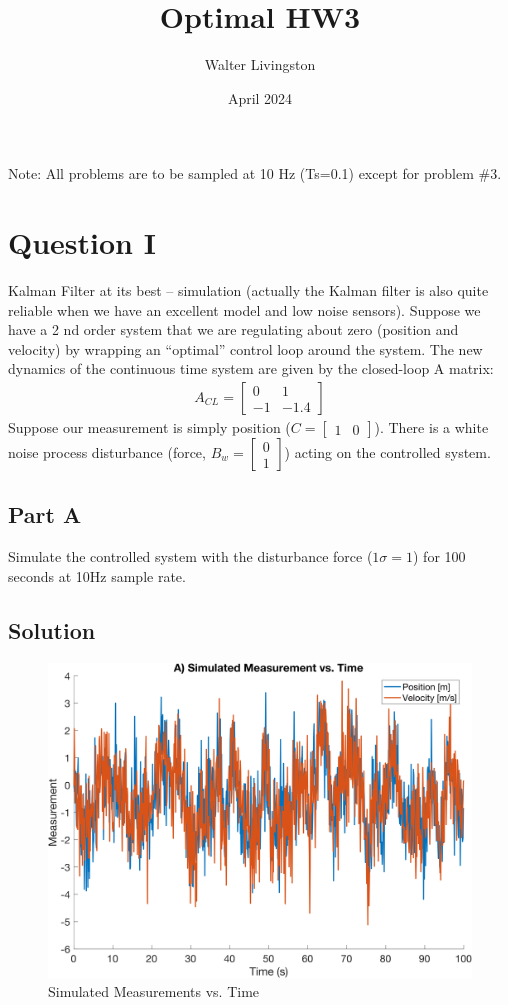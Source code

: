 \documentclass{article}
\title{Optimal HW3}
\author{Walter Livingston}
\date{April 2024}
\begin{document}
\maketitle

Note: All problems are to be sampled at 10 Hz (Ts=0.1) except for problem \#3.\\

\section*{Question I}
Kalman Filter at its best – simulation (actually the Kalman filter is also quite reliable
when we have an excellent model and low noise sensors). Suppose we have a 2 nd
order system that we are regulating about zero (position and velocity) by wrapping an
“optimal” control loop around the system. The new dynamics of the continuous time
system are given by the closed-loop A matrix:
\begin{gather}
    A_{CL} = \begin{bmatrix}
                 0 &    1 \\
                -1 & -1.4
            \end{bmatrix}
\end{gather}
Suppose our measurement is simply position ($C=\begin{bmatrix} 1 & 0 \end{bmatrix}$). There is a white noise
process disturbance (force, $B_w=\begin{bmatrix} 0 \\ 1 \end{bmatrix}$) acting on the controlled system.
\subsection*{Part A}
Simulate the controlled system with the disturbance force ($1\sigma=1$) for 100 seconds at 10Hz sample rate.
\subsection*{Solution}
\begin{figure}[H]
    \centering
    \includegraphics[width=0.75\linewidth]{../figures/p1a.png}
    \caption{Simulated Measurements vs. Time}\label{fig:p1a}
\end{figure}
\end{document}
